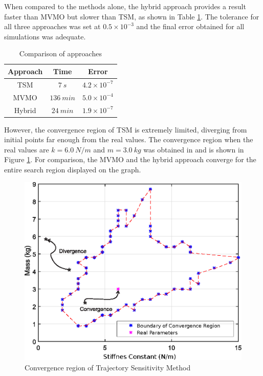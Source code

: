 When compared to the methods alone, the hybrid approach provides a result faster than MVMO but slower than TSM, as shown in Table \ref{tab: SM}. The tolerance for all three approaches was set at $0.5 \times 10^{-3}$ and the final error obtained for all simulations was adequate.

\begin{table}[]
	\caption{Comparison of approaches}
	\begin{center}
	\begin{tabular}{c|c|c}
		Approach & Time & Error \\
		\hline
		TSM  & $7 \ s$  & $4.2\times 10^{-7}$ \\
		MVMO  & $136 \ min$  & $5.0\times 10^{-4}$\\
		Hybrid  & $24 \ min$  & $1.9\times 10^{-7}$
	\end{tabular}
	\end{center}
	\label{tab: SM}
\end{table}

However, the convergence region of TSM is extremely limited, diverging from initial points far enough from the real values. The convergence region when the real values are $k = 6.0 \ N/m$ and $m = 3.0 \ kg$ was obtained in \cite{Ecyo} and is shown in Figure \ref{fig: conv_reg}. For comparison, the MVMO and the hybrid approach converge for the entire search region displayed on the graph.

\begin{figure}[h]
	\caption{Convergence region of Trajectory Sensitivity Method}
	\begin{center}
		\includegraphics[scale=0.8]{Images/Conv_reg.eps}
	\end{center}
	\label{fig: conv_reg}
\end{figure}

